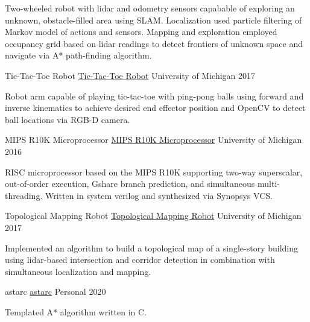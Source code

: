 \documentclass[11pt, a4paper]{cv}
\begin{document}
\begin{cv}
\begin{projects}
\begin{cventries}
{\begin{cvparagraph}
Two-wheeled robot with lidar and odometry sensors capabable of exploring an unknown, obstacle-filled area using SLAM. Localization used particle filtering of Markov model of actions and sensors. Mapping and exploration employed occupancy grid based on lidar readings to detect frontiers of unknown space and navigate via A* path-finding algorithm.
\end{cvparagraph}}
\cventrycompact
{
{Tic-Tac-Toe Robot}
{\color{hrefblue}\href{https://drive.google.com/drive/folders/17dpGI2AZXLQeBZ3MueF8agzo8r2cehZu}{Tic-Tac-Toe Robot}}}
{}
{University of Michigan}
{2017}
{\begin{cvparagraph}
Robot arm capable of playing tic-tac-toe with ping-pong balls using forward and inverse kinematics to achieve desired end effector position and OpenCV to detect ball locations via RGB-D camera.
\end{cvparagraph}}
\cventrycompact
{
{MIPS R10K Microprocessor}
{\color{hrefblue}\href{https://drive.google.com/drive/folders/17iu4ip747moZ4sQQZMi77J8Z0gzI8UFG}{MIPS R10K Microprocessor}}}
{}
{University of Michigan}
{2016}
{\begin{cvparagraph}
RISC microprocessor based on the MIPS R10K supporting two-way superscalar, out-of-order execution, Gshare branch prediction, and simultaneous multi-threading. Written in system verilog and synthesized via Synopsys VCS.
\end{cvparagraph}}
\cventrycompact
{
{Topological Mapping Robot}
{\color{hrefblue}\href{https://drive.google.com/drive/folders/17\_EqmLftuGBope85FtokHQAA6ugtmVWc}{Topological Mapping Robot}}}
{}
{University of Michigan}
{2017}
{\begin{cvparagraph}
Implemented an algorithm to build a topological map of a single-story building using lidar-based intersection and corridor detection in combination with simultaneous localization and mapping.
\end{cvparagraph}}
\cventrycompact
{
{astarc}
{\color{hrefblue}\href{https://github.com/brandonmosher/astarc}{astarc}}}
{}
{Personal}
{2020}
{\begin{cvparagraph}
Templated A* algorithm written in C.
\end{cvparagraph}}
\cventrycompact
{
}
\end{cventries}
\end{projects}
\end{cv}
\end{document}
